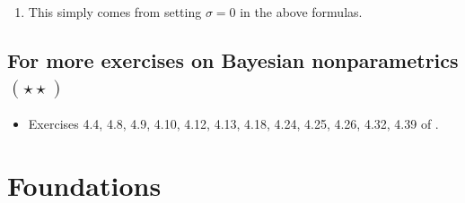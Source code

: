 \documentclass{article}
\begin{document}
{\begin{enumerate}
\begin{align}
&= \frac{\mathbb{E}[K_n]\sigma (n- \alpha ) + n \alpha - \sigma^2 (\mathbb{E}[K_n]^2 +  \mbox{Var}(K_n))}{(n+\alpha)^2},\label{eq: var 1st}
\end{align}
while \eqref{eq: exp_PY_rec} provides for second term of the right-hand side of \eqref{eq:var} 
 \begin{equation}\label{eq: var 2nd}
\mbox{Var}(\mathbb{E}[K_{n+1}\mid K_1,\ldots,K_{n}=K])=\left( \frac{\sigma + n + \alpha}{n+\alpha}\right)^2 \mbox{Var}(K_n).
\end{equation}
Then combining \eqref{eq: var 1st} and \eqref{eq: var 2nd},  the following recursive formula holds
\begin{align}\label{eq:s2-recursive}
 \mbox{Var}(K_{n+1}) &= \mbox{Var}(K_n)\frac{n + \alpha + 2\sigma}{n+\alpha} + \frac{\sigma\mathbb{E}[K_n](n - \alpha - \sigma\mathbb{E}[K_n]) + n \alpha}{(n+\alpha)^2}\nonumber\\
 &= \mbox{Var}(K_n)\frac{n + \alpha + 2\sigma}{n+\alpha} + \frac{(\sigma\mathbb{E}[K_n]+ \alpha)(n - \sigma\mathbb{E}[K_n])}{(n+\alpha)^2},
\end{align} 
which simplifies to the desired expression by using 
$$\mathbb{E}[K_n] = \frac{\alpha}{\sigma}\left(\frac{(\alpha +\sigma)_{n}}{(\alpha)_{n}}-1\right).$$
\item This simply comes from setting $\sigma = 0$ in the above formulas.
\end{enumerate}
}

 \subsection{For more exercises on Bayesian nonparametrics $(\star\star)$}

 \begin{itemize}
 	\item Exercises 4.4, 4.8, 4.9, 4.10, 4.12, 4.13, 4.18, 4.24, 4.25, 4.26, 4.32, 4.39
 of \cite{ghosal2017fundamentals}.
 \end{itemize}

\section{Foundations}
\end{document}

